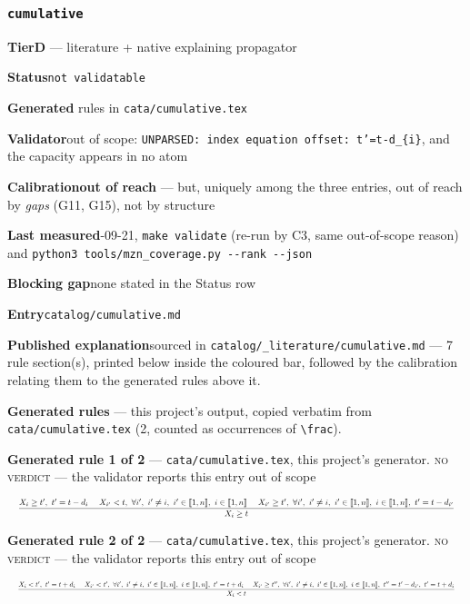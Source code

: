 \documentclass[10pt,a4paper]{article}
\newcommand{\entryfield}[2]{{\raggedright\textbf{#1}\quad #2\par}}
\newcommand{\rulebox}[1]{%
  \[\resizebox{\ifdim\width>\linewidth\linewidth\else\width\fi}{!}%
    {$\displaystyle #1$}\]}
\begin{document}
\subsubsection*{\texttt{cumulative}}
\label{entry:cumulative}
\entryfield{Tier}{\textbf{D} --- literature + native explaining propagator}
\entryfield{Status}{\texttt{not validatable}}
\entryfield{Generated}{2 rules in \texttt{cata/cumulative.tex}}
\entryfield{Validator}{out of scope: \texttt{UNPARSED: index equation offset: t'=t-\allowbreak{}d\_\allowbreak{}\{i\}}, and the capacity appears in no atom}
\entryfield{Calibration}{\textbf{out of reach} --- but, uniquely among the three entries, out of reach by \emph{gaps} (G11, G15), not by structure}
\entryfield{Last measured}{2026-09-21, \texttt{make validate} (re-run by C3, same out-of-scope reason) and \texttt{python3 tools/\allowbreak{}mzn\_\allowbreak{}coverage.\allowbreak{}py -\allowbreak{}-\allowbreak{}rank -\allowbreak{}-\allowbreak{}json}}
\entryfield{Blocking gap}{none stated in the Status row}
\entryfield{Entry}{\texttt{catalog/cumulative.md}}
\entryfield{Published explanation}{sourced in \texttt{catalog/\_\allowbreak{}literature/cumulative.md} --- 7 rule section(s), printed below inside the coloured bar, followed by the calibration relating them to the generated rules above it.}

\textbf{Generated rules} --- this project's output, copied verbatim from \texttt{cata/cumulative.tex} (2, counted as occurrences of \texttt{\textbackslash{}frac}).\par

{\small\textbf{Generated rule 1 of 2} --- \texttt{cata/cumulative.tex}, this project's generator. \textsc{no verdict} --- the validator reports this entry out of scope\par}
\rulebox{\frac{X_{i} \geq t',~t'=t-d_{i}~~~~X_{i'}<t,~\forall i',~i' \neq i,~i' \in \llbracket1,n\rrbracket,~i \in \llbracket1,n\rrbracket~~~~X_{i'} \geq t',~\forall i',~i' \neq i,~i' \in \llbracket1,n\rrbracket,~i \in \llbracket1,n\rrbracket,~t'=t-d_{i'}}{X_{i} \geq t}}

{\small\textbf{Generated rule 2 of 2} --- \texttt{cata/cumulative.tex}, this project's generator. \textsc{no verdict} --- the validator reports this entry out of scope\par}
\rulebox{\frac{X_{i}<t',~t'=t+d_{i}~~~~X_{i'}<t',~\forall i',~i' \neq i,~i' \in \llbracket1,n\rrbracket,~i \in \llbracket1,n\rrbracket,~t'=t+d_{i}~~~~X_{i'} \geq t'',~\forall i',~i' \neq i,~i' \in \llbracket1,n\rrbracket,~i \in \llbracket1,n\rrbracket,~t''=t'-d_{i'},~t'=t+d_{i}}{X_{i}<t}}
\end{document}
